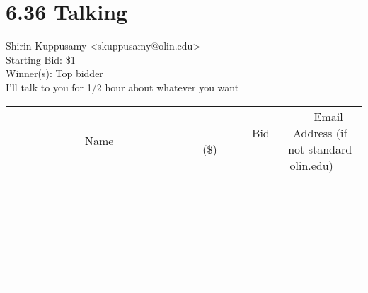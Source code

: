 \documentclass[11pt]{article}
\begin{document}
					\section*{6.36 Talking}
					Shirin Kuppusamy <skuppusamy@olin.edu> \\
					Starting Bid: \$1 \\
					Winner(s): Top bidder \\
					I'll talk to you for 1/2 hour about whatever you want \\
					[6ex]
					\begin{tabular}{c c c}
						~~~~~~~~~~~~~Name~~~~~~~~~~~~~ & ~~~~~~~~~Bid (\$)~~~~~~~~~ & ~~~Email Address (if not standard olin.edu)~~~ \\
				
 & & \\
\hline
 & & \\
\hline
 & & \\
\hline
 & & \\
\hline
 & & \\
\hline
 & & \\
\hline
 & & \\
\hline
 & & \\
\hline
 & & \\
\hline
 & & \\
\hline
 & & \\
\hline
 & & \\
\hline
 & & \\
\hline
 & & \\
\hline
 & & \\
\hline
 & & \\
\hline
 & & \\
\hline
 & & \\
\hline
 & & \\
\hline
 & & \\
\hline
 & & \\
\hline
 & & \\
\hline
 & & \\
\hline
 & & \\
\hline
 & & \\
\hline
 & & \\
\hline
					\end{tabular}
					\clearpage
				
\end{document}
